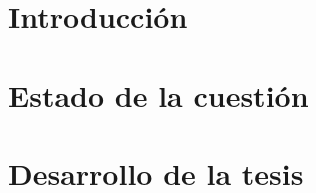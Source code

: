 \documentclass[a4paper,nobib,makeidx,justified,twoside,symmetric]{tufte-book}
\title{\thetitle}
\author[\theauthor]{\theauthor}
\begin{document}

\frontmatter
\maketitle



\cleardoublepage

\tableofcontents
\printglossaries
\listoffigures
\listoftables

\mainmatter
\part{Introducción}

\part{Estado de la cuestión}



\part{Desarrollo de la tesis}




\backmatter



\printindex


\end{document}
